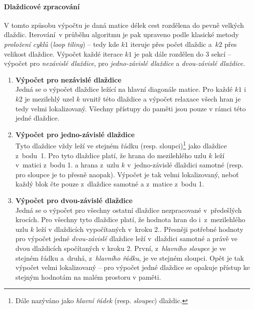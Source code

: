 \paragraph{Dlaždicové zpracování}
V tomto způsobu výpočtu je daná matice délek cest rozdělena do pevně velkých dlaždic. Iterování~v průběhu algoritmu je pak
upraveno podle klasické metody \emph{proložení cyklů} (\emph{loop tiling}) -- tedy kde $k1$ iteruje přes počet dlaždic 
a~$k2$ přes velikost dlaždice. Výpočet každé iterace $k1$ je pak dále rozdělen do
3 sekcí -- výpočet pro \emph{nezávislé dlaždice}, pro \emph{jedno-závislé dlaždice} a \emph{dvou-závislé dlaždice}.
\begin{enumerate}
    \item \textbf{Výpočet pro nezávislé dlaždice} \label{cuda:dlazdice:nezavisle} \\
        Jedná se o výpočet dlaždice ležící na hlavní diagonále matice. Pro každé $k1$ i~$k2$ je mezilehlý uzel $k$ uvnitř této
        dlaždice a výpočet relaxace všech hran je tedy velmi lokalizovaný. Všechny přístupy do paměti jsou pouze v rámci této jedné dlaždice.

    \item \textbf{Výpočet pro jedno-závislé dlaždice} \label{cuda:dlazdice:jednozavisle} \\ 
        Tyto dlaždice vždy leží ve stejném řádku (resp. sloupci)\footnote{Dále nazýváno jako \emph{hlavní řádek} (resp.
        \emph{sloupec}) dlaždic.} jako dlaždice z~bodu~1. Pro tyto dlaždice platí, že hrana do 
        mezilehlého uzlu $k$ leží v~matici z~bodu 1. a hrana z~uzlu $k$ v~jedno-závislé dlaždici samotné (resp. pro sloupce je to 
        přesně naopak). Výpočet je tak velmi lokalizovaný, neboť každý blok čte pouze z~dlaždice samotné a z~matice z~bodu 1.

    \item \textbf{Výpočet pro dvou-závislé dlaždice} \label{cuda:dlazdice:dvouzavisle} \\
        Jedná se o výpočet pro všechny ostatní dlaždice nezpracované v~pře\-deš\-lých krocích. Pro všechny tyto dlaždice platí, že 
        hodnota hran do i~z~me\-zi\-leh\-lé\-ho uzlu $k$ leží v dlaždicích vypočítaných v~kroku 2.. Přesněji potřebné hodnoty pro výpočet
        jedné \emph{dvou-závislé} dlaždice leží v~dlaždici samotné a právě ve dvou dlaždicích spočítaných v kroku 2. První, 
        z~\emph{hlavního sloupce} je ve stejném řádku a~druhá, z~\emph{hlavního řádku}, je ve stejném sloupci. Opět je tak 
        výpočet velmi lokalizovaný -- pro výpočet jedné dlaždice se opakuje přístup ke stejným hodnotám na malém prostoru v paměti.

\end{enumerate}

